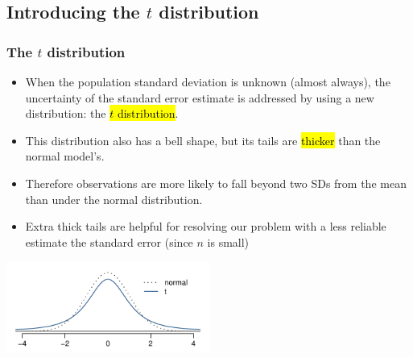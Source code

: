 \documentclass[notes,11pt, aspectratio=169]{beamer}
\begin{document}

\subsection{Introducing the $t$ distribution}


\begin{frame}
\frametitle{The $t$ distribution}

\begin{itemize}

\item When the population standard deviation is unknown (almost always), the uncertainty of the standard error estimate is addressed by using a new distribution: the \hl{$t$ distribution}.

\pause

\item This distribution also has a bell shape, but its tails are \hl{thicker} than the normal model's.

\pause

\item Therefore observations are more likely to fall beyond two SDs from the mean than under the normal distribution.

\pause

\item Extra thick tails are helpful for resolving our problem with a less reliable estimate the standard error (since $n$ is small)

\end{itemize}

\begin{center}
\includegraphics[width=0.5\textwidth]{graphs/tDistCompareToNormalDist}
\end{center}

\end{frame}

\end{document}
